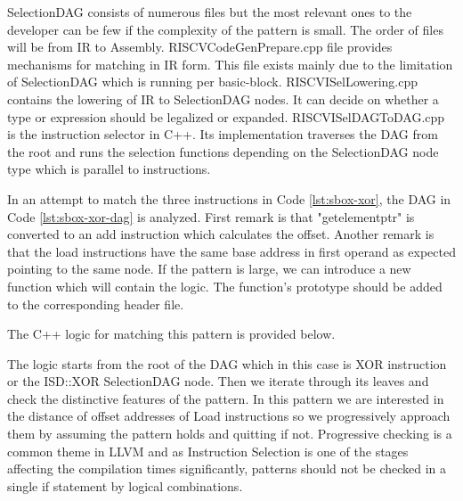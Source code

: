 SelectionDAG consists of numerous files but the most relevant ones to the developer can be few if the complexity of the pattern is small. The order of files will be from IR to Assembly. RISCVCodeGenPrepare.cpp file provides mechanisms for matching in IR form. This file exists mainly due to the limitation of SelectionDAG which is running per basic-block. RISCVISelLowering.cpp contains the lowering of IR to SelectionDAG nodes. It can decide on whether a type or expression should be legalized or expanded. RISCVISelDAGToDAG.cpp is the instruction selector in C++. Its implementation traverses the DAG from the root and runs the selection functions depending on the SelectionDAG node type which is parallel to instructions. 




In an attempt to match the three instructions in Code \ref{lst:sbox-xor}, the DAG in Code \ref{lst:sbox-xor-dag} is analyzed. First remark is that "getelementptr" is converted to an add instruction which calculates the offset. Another remark is that the load instructions have the same base address in first operand as expected pointing to the same node. If the pattern is large, we can introduce a new function which will contain the logic. The function's prototype should be added to the corresponding header file.





The C++ logic for matching this pattern is provided below.



The logic starts from the root of the DAG which in this case is XOR instruction or the ISD::XOR SelectionDAG node. Then we iterate through its leaves and check the distinctive features of the pattern. In this pattern we are interested in the distance of offset addresses of Load instructions so we progressively approach them by assuming the pattern holds and quitting if not. Progressive checking is a common theme in LLVM and as Instruction Selection is one of the stages affecting the compilation times significantly, patterns should not be checked in a single if statement by logical combinations. 

